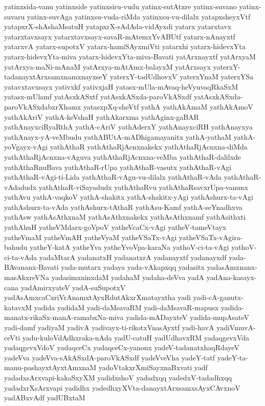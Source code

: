 {yatinxsida-vanu
yatinxside
yatinxsiru-vudu
yatinx-sutAtxre
yatinx-suvano
yatinx-suvaru
yatinx-suvAga
yatinxsu-vuda-riMda
yatinxsu-vu-dilalx
yatapxsheyxVtf
yatapxrX-shAshaMsatuH
yatapxrX-sAdAda-vidAyxdi
yatarx
yatarxtavx
yatarxtavxsayx
yatarxtavxsayx-savaR-mAtemxYvABUtf
yatarx-nAnayxtf
yatarxvA
yatarx-supotxV
yatarx-hamiSAyxmiVti
yatarxhi
yatarx-hidevxYta
yatarx-hidevxYta-miva
yatarx-hidevxYta-miva-Bavati
yatArxnayxtf
yatArxyaM
yatArxya-maNi-mAnaM
yatArxya-mAtAmx-balayxM
yatArxsayx
yaterxY-tadanayxtArxsamxnamxnayxseY
yaterxY-tadUdhovxV
yaterxYnaM
yaterxYSa
yatavxtavxsayx
yativxkf
yativxjaH
yatasx-mUla-mAvaq-heVyuvaqRkaSxM
yatasx-mUlamf
yatAsxkASxtf
yatAsxkASxda-paroVkASxdf
yatAsxkASxda-paroVkASxdabxrXhamx
yatasxpXq-sheVtf
yathA
yathAkAmaM
yathAkAmoV
yathAkAriV
yathA-keVshaH
yathAkarxma
yathAginx-gaBAR
yathAnayxciRyaRthA
yathA-cAriV
yathAderxY
yathAnayxciRH
yathAnayxya
yathAnayx-yA-veMbudu
yathABUtA-mADhigamayanitx
yathA-yathaM
yathA-yoVgayx-vAgi
yathAthaR
yathAthaRjAcnxnakekx
yathAthaRjAcnxna-diMda
yathAthaRjAcnxna-vAguva
yathAthaRjAcnxna-veMba
yathAthaR-dalilxde
yathAthaRnuBava
yathAthaR-rUpa
yathAthaR-vasutx
yathAthaR-vAgi
yathAthaR-vAgi-ti-Lida
yathAthaR-vAgu-vu-dilalx
yathAthaR-vAda
yathAthaR-vAdadudx
yathAthaR-viSayadudx
yathAthaRvu
yathAthaRsavxrUpa-vanunx
yathAvu
yathA-vaqkoV
yathA-shakitx
yathA-shakitx-yAgi
yathAshurx-ta-vAgi
yathAshurx-ta-vAda
yathAshurx-tAthaR
yathAsu-Kamf
yathA-seYnadhxva
yathAsw
yathAsAthxnaM
yathAsAthxnakekx
yathAsAthxnamf
yathAsithxti
yathAhuH
yatheVMdarx-goVpoV
yatheVcaCx-vAgi
yatheV-tameVtayx
yatheVmaM
yatheVmAH
yatheVyaM
yatheVSaTx-vAgi
yatheVSaTx-vAgira-bahudu
yatheY-katA
yatheYva
yatheYvoVpa-karaNa
yathoV-ci-ta-vAgi
yathoV-ci-ta-vAda
yadaMtarA
yadanatxH
yadanatxrA
yadanayxtf
yadanayxdf
yada-BAvananx-Bavati
yada-mutarx
yadaya
yada-vAkapxqq
yadasitx
yadasAmxnanx-masAkxreVNa
yadasimxninxdaM
yadahaM
yadaha-deVva
yadA
yadAna-kasayx-cana
yadAmirxyateV
yadA-suSupotxV
yadAsAmxcaCxriVrAnamxtAyxRdutAkxrXmatayxtha
yadi
yadi-cA-ganutx-katavxM
yadida
yadidaM
yadi-daMsavaRM
yadi-daMsavaR-mapusx
yadida-manatx-rikaSx-manA-ramabxNa-miva
yadida-mADayxteV
yadida-mupAsateV
yadi-damf
yadiyaM
yadivA
yadivayx-ti-rikotxVnasAyxtf
yadi-havA
yadiVmuvA-ceVti
yadu-kuloVdAdhxraka-nAda
yadU-catuH
yadUdhavxRM
yadaqgevxVda
yadaqgevxVdoV
yadaqceCx
yadaqceCx-yanonx
yadeV-tadanatxhaqRdayeV
yadeVva
yadeVva-sAkASxdA-paroVkASxdf
yadeVveVha
yadeY-tatf
yadeY-ta-manu-pashayxtAyxtAmxnaM
yadoVtakxrXmiSayxnaBxvati
yadf
yadadxsArxvapi-kakaSxyXM
yadidxshoV
yadadxqq
yadedxV-tadadhxqq
yadadxrXsArxvapi
yadidhx
yadedhxyXVta-danayxtArxsamxsAyxCAvxnoV
yadABxvAdf
yadUBxtaM
}
